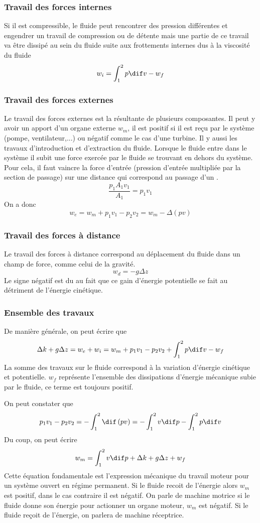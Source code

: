 \subsubsection{Travail des forces internes}
Si il est compressible, le fluide peut rencontrer des pression différentes et
engendrer un travail de compression ou de détente mais une partie
de ce travail va être dissipé au sein du fluide suite aux
frottements internes dus à la viscosité du fluide
\[  w_i = \int_1^2 p \dif v - w_f \]

\subsubsection{Travail des forces externes}
Le travail des forces externes est la résultante de plusieurs composantes.
Il peut y avoir un apport d'un organe externe $w_m$,
il est positif si il est reçu par le système (pompe, ventilateur,...) ou
négatif comme le cas d'une turbine.
Il y aussi les travaux d'introduction et d'extraction du fluide.
Lorsque le fluide  entre dans le système il subit une force exercée
par le fluide se trouvant en dehors du système.
Pour cela, il faut vaincre la force d'entrée
(pression d'entrée multipliée par la section de passage)
sur une distance qui correspond au passage d'un \kilogram.
\[ \frac{p_1A_1v_1}{A_1} = p_1v_1 \]
On a donc
\[ w_e = w_m + p_1v_1 - p_2v_2 = w_m - \Delta(pv) \]

\subsubsection{Travail des forces à distance}
Le travail des forces à distance correspond au déplacement du fluide
dans un champ de force, comme celui de la gravité.
\[  w_d = -g \Delta z \]
Le signe négatif est du au fait que ce gain d'énergie potentielle
se fait au détriment de l'énergie cinétique.

\subsubsection{Ensemble des travaux}
De manière générale, on peut écrire que
\[ \Delta k + g\Delta z = w_e + w_i =
w_m + p_1v_1 - p_2v_2 + \int_1^2 p \dif v - w_f \]
La somme des travaux sur le fluide correspond
à la variation d'énergie cinétique et potentielle.
$w_f$ représente l'ensemble des dissipations
d'énergie mécanique subie par le fluide, ce terme est toujours positif.

On peut constater que
\[  p_1v_1-p_2v_2 = -\int_1^2 \dif\left(pv\right) =
  -\int_1^2 v\dif p - \int_1^2 p\dif v \]
Du coup, on peut écrire
\[ w_m = \int_1^2v\dif p + \Delta k + g\Delta z + w_f \]
Cette équation fondamentale est l'expression mécanique
du travail moteur pour un système ouvert en régime permanent.
Si le fluide recoit de l'énergie alors $w_m$ est positif,
dans le cas contraire il est négatif.
On parle de machine motrice si le fluide donne son énergie
pour actionner un organe moteur, $w_m$ est négatif.
Si le fluide reçoit de l'énergie, on parlera de machine réceptrice.

